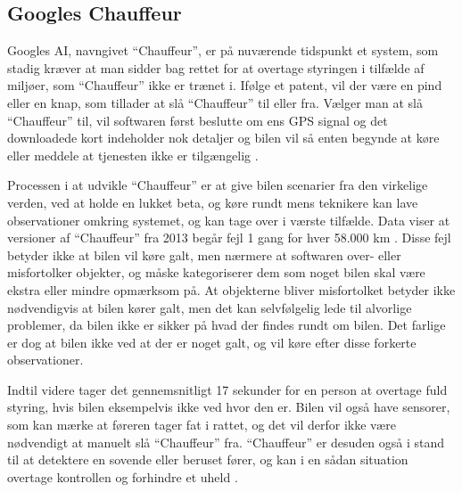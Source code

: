 \subsection{Googles Chauffeur}
\label{chauffeur}
Googles AI, navngivet ``Chauffeur'', er på nuværende tidspunkt et system, som stadig kræver at man sidder bag rettet for at overtage styringen i tilfælde af miljøer, som ``Chauffeur'' ikke er trænet i. Ifølge et patent, vil der være en pind eller en knap, som tillader at slå ``Chauffeur'' til eller fra. Vælger man at slå ``Chauffeur'' til, vil softwaren først beslutte om ens GPS signal og det downloadede kort indeholder nok detaljer og bilen vil så enten begynde at køre eller meddele at tjenesten ikke er tilgængelig \cite{GooglePatent}.

Processen i at udvikle ``Chauffeur'' er at give bilen scenarier fra den virkelige verden, ved at holde en lukket beta, og køre rundt mens teknikere kan lave observationer omkring systemet, og kan tage over i værste tilfælde. Data viser at versioner af ``Chauffeur'' fra 2013 begår fejl 1 gang for hver 58.000 km \cite{PopSci}. Disse fejl betyder ikke at bilen vil køre galt, men nærmere at softwaren over- eller misfortolker objekter, og måske kategoriserer dem som noget bilen skal være ekstra eller mindre opmærksom på. At objekterne bliver misfortolket betyder ikke nødvendigvis at bilen kører galt, men det kan selvfølgelig lede til alvorlige problemer, da bilen ikke er sikker på hvad der findes rundt om bilen. Det farlige er dog at bilen ikke ved at der er noget galt, og vil køre efter disse forkerte observationer.

Indtil videre tager det gennemsnitligt 17 sekunder for en person at overtage fuld styring, hvis bilen eksempelvis ikke ved hvor den er. Bilen vil også have sensorer, som kan mærke at føreren tager fat i rattet, og det vil derfor ikke være nødvendigt at manuelt slå ``Chauffeur'' fra. ``Chauffeur'' er desuden også i stand til at detektere en sovende eller beruset fører, og kan i en sådan situation overtage kontrollen og forhindre et uheld \cite{GooglePatent}.


